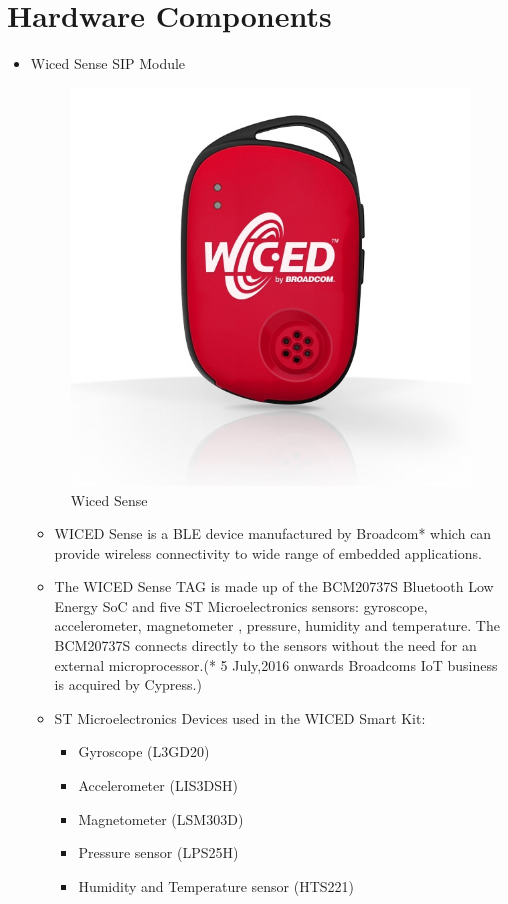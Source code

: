 \documentclass[a4paper,12pt,oneside]{book}
\begin{document}
\section{Hardware Components}
\begin{itemize}

  \item Wiced Sense SIP Module
  
        \begin{figure}[h]
    \centering
	\includegraphics[scale=0.5]{WICED_SENSE.jpg}
	\caption{Wiced Sense}
	\end{figure}
	

    \begin{itemize}
    \item WICED Sense is a BLE device manufactured by Broadcom* which can provide wireless connectivity to wide range of embedded applications.
    \item The WICED Sense TAG is made up of the BCM20737S Bluetooth Low Energy SoC and five ST Microelectronics sensors: gyroscope, accelerometer, magnetometer , pressure, humidity and temperature. The BCM20737S connects directly to the sensors without the need for an external microprocessor.(* 5 July,2016 onwards Broadcoms IoT business is acquired by Cypress.)
    \item ST Microelectronics Devices used in the WICED Smart Kit:
    \begin{itemize}
    \item Gyroscope (L3GD20)
    \item Accelerometer (LIS3DSH)
    \item Magnetometer (LSM303D)
    \item Pressure sensor (LPS25H)
    \item Humidity and Temperature sensor (HTS221)
    \end{itemize}
	\end{itemize}
	

\end{itemize}
\end{document}
